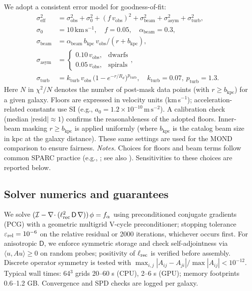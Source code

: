 \documentclass[fleqn,usenatbib]{mnras}
\begin{document}
We adopt a consistent error model for goodness-of-fit:
\begin{align}
\sigma_\mathrm{eff}^2 &= \sigma_\mathrm{obs}^2 + \sigma_0^2 + (f\,v_\mathrm{obs})^2 + \sigma_\mathrm{beam}^2 + \sigma_\mathrm{asym}^2 + \sigma_\mathrm{turb}^2,\\
\sigma_0 &= 10\,\mathrm{km\,s^{-1}},\quad f = 0.05,\quad \alpha_\mathrm{beam}=0.3,\\
\sigma_\mathrm{beam} &= \alpha_\mathrm{beam}\, b_\mathrm{kpc}\, v_\mathrm{obs}/(r+b_\mathrm{kpc}),\\
\sigma_\mathrm{asym} &= \begin{cases}0.10\,v_\mathrm{obs}, & \text{dwarfs}\\ 0.05\,v_\mathrm{obs}, & \text{spirals}\end{cases},\\
\sigma_\mathrm{turb} &= k_\mathrm{turb}\, v_\mathrm{obs}\,\big(1-e^{-r/R_d}\big)^{p_\mathrm{turb}},\quad k_\mathrm{turb}=0.07,\ p_\mathrm{turb}=1.3.
\end{align}
\noindent Here $N$ in $\chi^2/N$ denotes the number of post-mask data points (with $r\ge b_\mathrm{kpc}$) for a given galaxy. Floors are expressed in velocity units (km\,s$^{-1}$); acceleration-related constants use SI (e.g., $a_0=1.2\times10^{-10}\,\mathrm{m\,s^{-2}}$). A calibration check (median $|\mathrm{resid}|\approx1$) confirms the reasonableness of the adopted floors.
Inner-beam masking $r\ge b_\mathrm{kpc}$ is applied uniformly (where $b_\mathrm{kpc}$ is the catalog beam size in kpc at the galaxy distance). These same settings are used for the MOND comparison to ensure fairness.
\noindent\textit{Notes.} Choices for floors and beam terms follow common SPARC practice (e.g., \citealp{lelli2016sparc}; see also \citealp{mcgaugh2016}). Sensitivities to these choices are reported below.

\subsection{Solver numerics and guarantees}
\noindent We solve $(\mathcal I-\nabla\!\cdot(\ell_{\rm rec}^2\,\mathsf D\,\nabla))\,\phi=f_\alpha$ using preconditioned conjugate gradients (PCG) with a geometric multigrid V-cycle preconditioner; stopping tolerance $\varepsilon_{\rm rel}=10^{-6}$ on the relative residual or 2000 iterations, whichever occurs first. For anisotropic $\mathsf D$, we enforce symmetric storage and check self-adjointness via $\langle u,Au\rangle\ge0$ on random probes; positivity of $\ell_{\rm rec}$ is verified before assembly. Discrete operator symmetry is tested with $\max_{i,j}|A_{ij}-A_{ji}|/\max|A_{ij}|<10^{-12}$. Typical wall times: 64$^3$ grids 20–60 s (CPU), 2–6 s (GPU); memory footprints 0.6–1.2 GB. Convergence and SPD checks are logged per galaxy.
\end{document}
